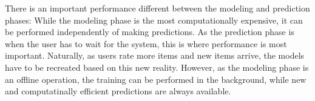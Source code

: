 There is an important performance different between the modeling and prediction phases:
While the modeling phase is the most computationally expensive,
it can be performed independently of making predictions.
As the prediction phase is when the user has to wait for the system,
this is where performance is most important.
Naturally, as users rate more items and new items arrive,
the models have to be recreated based on this new reality.
However, as the modeling phase is an offline operation,
the training can be performed in the background, while new
and computatinally efficient predictions are always available.



